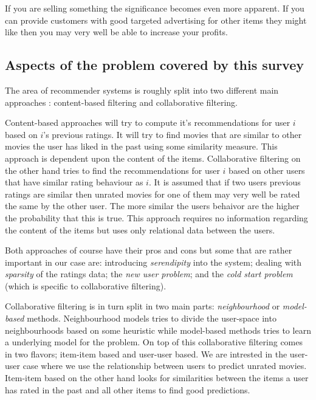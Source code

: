 \documentclass[a4paper,11pt]{article}
\begin{document}
If you are selling something the significance becomes even more apparent. If
you can provide customers with good targeted advertising for other items they might like then
you may very well be able to increase your profits.

\subsection{Aspects of the problem covered by this survey}
The area of recommender systems is roughly split into two different main approaches \cite{1423975}:
content-based filtering and collaborative filtering.

Content-based approaches will try to compute it's recommendations for user $i$ based on $i$'s previous ratings.
It will try to find movies that are similar to other movies the user has liked in the past using some
similarity measure. This approach is dependent upon the content of the items. Collaborative filtering
on the other hand tries to find the recommendations for user $i$ based on other users that have similar
rating behaviour as $i$. It is assumed that if two users previous ratings are similar then unrated
movies for one of them may very well be rated the same by the other user. The more similar the users behaivor are
the higher the probability that this is true. This approach requires no information regarding the content
of the items but uses only relational data between the users. 

Both approaches of course have their pros and cons but some that are rather important in our case are:
introducing \emph{serendipity} into the system; dealing with \emph{sparsity} of the ratings data; the
\emph{new user problem}; and the \emph{cold start problem} (which is specific to collaborative filtering).

Collaborative filtering is in turn split in two main parts: \emph{neighbourhood} or \emph{model-based} methods.
Neighbourhood models tries to divide the user-space into neighbourhoods based on some heuristic while model-based
methods tries to learn a underlying model for the problem. 
On top of this collaborative filtering comes in two flavors; item-item based and user-user based. We are intrested
in the user-user case where we use the relationship between users to predict unrated movies. Item-item based on the
other hand looks for similarities between the items a user has rated in the past and all other items to find good
predictions. 
\end{document}
